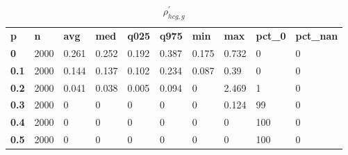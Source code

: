 \begin{table}[h]
 \centering 
\footnotesize
\caption{$\rho_{hcg,g}^\prime $}
\label{tab:alphahcgg}
\begin{tabular}[h]{| l l l l l l l l l l|
    } \hline
\textbf{ p} & \textbf{ n} & \textbf{ avg} & \textbf{ med} & \textbf{ q025} & \textbf{ q975} & \textbf{ min} & \textbf{ max} & \textbf{ pct\_0} & \textbf{ pct\_nan}
           \\
  \textbf{  0} & 2000 & 0.261 & 0.252 & 0.192 & 0.387 & 0.175 & 0.732 &   0 & 0
           \\
  \textbf{0.1} & 2000 & 0.144 & 0.137 & 0.102 & 0.234 & 0.087 &  0.39 &   0 & 0
           \\
  \textbf{0.2} & 2000 & 0.041 & 0.038 & 0.005 & 0.094 &     0 & 2.469 &   1 & 0
           \\
  \textbf{0.3} & 2000 &     0 &     0 &     0 &     0 &     0 & 0.124 &  99 & 0
           \\
  \textbf{0.4} & 2000 &     0 &     0 &     0 &     0 &     0 &     0 & 100 & 0
           \\
  \textbf{0.5} & 2000 &     0 &     0 &     0 &     0 &     0 &     0 & 100 & 0
           \\
 \hline \end{tabular}
 \end{table}
